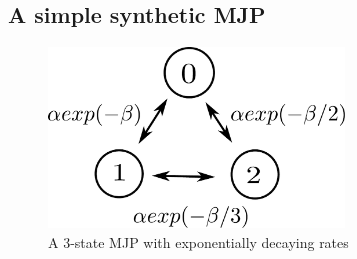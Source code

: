 \subsection{A simple synthetic MJP}
  \begin{figure}[H]
  \centering
  \begin{minipage}[!hp]{0.45\linewidth}
  \centering
    \includegraphics [width=0.70\textwidth, angle=0]{figs/exp_model.pdf}
      \end{minipage}
    \caption{A 3-state MJP with exponentially decaying rates}
    \label{fig:exp_model}
  \end{figure}

